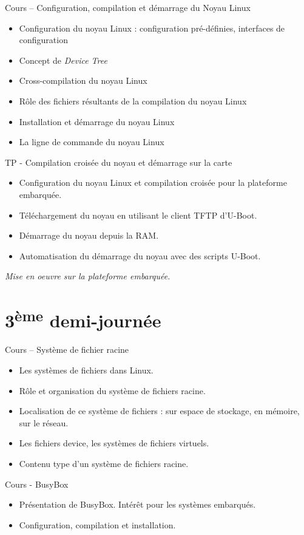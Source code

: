 \documentclass[a4paper,12pt,obeyspaces,spaces,hyphens]{article}
\begin{document}
\feagendatwocolumn
{Cours – Configuration, compilation et démarrage du Noyau Linux}
{
  \begin{itemize}
  \item Configuration du noyau Linux : configuration pré-définies,
    interfaces de configuration
  \item Concept de {\em Device Tree}
  \item Cross-compilation du noyau Linux
  \item Rôle des fichiers résultants de la compilation du noyau Linux
  \item Installation et démarrage du noyau Linux
  \item La ligne de commande du noyau Linux
  \end{itemize}
}
{TP - Compilation croisée du noyau et démarrage sur la carte}
{
  \begin{itemize}
  \item Configuration du noyau Linux et compilation croisée pour la
    plateforme embarquée.
  \item Téléchargement du noyau en utilisant le client TFTP d'U-Boot.
  \item Démarrage du noyau depuis la RAM.
  \item Automatisation du démarrage du noyau avec des scripts U-Boot.
  \end{itemize}

  \vspace{0.5cm}
  {\em Mise en oeuvre sur la plateforme embarquée.}
}

\section{3\textsuperscript{ème} demi-journée}

\feagendatwocolumn
{Cours – Système de fichier racine}
{
  \begin{itemize}
  \item Les systèmes de fichiers dans Linux.
  \item Rôle et organisation du système de fichiers racine.
  \item Localisation de ce système de fichiers : sur espace
	de stockage, en mémoire, sur le réseau.
  \item Les fichiers device, les systèmes de fichiers virtuels.
  \item Contenu type d'un système de fichiers racine.
  \end{itemize}
}
{Cours - BusyBox}
{
  \begin{itemize}
  \item Présentation de BusyBox. Intérêt pour les systèmes embarqués.
  \item Configuration, compilation et installation.
  \end{itemize}
}
\end{document}
